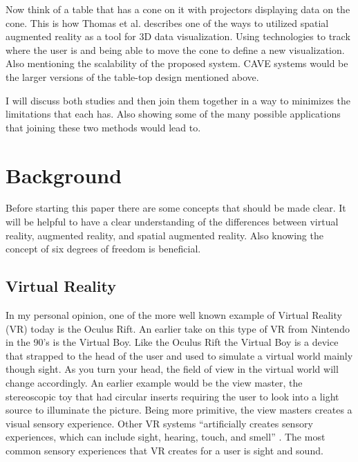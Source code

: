 \documentclass{sig-alternate}
\begin{document}
Now think of a table that has a cone on it with projectors displaying data on the cone. This is how Thomas et al. describes one of the ways to utilized spatial augmented reality as a tool for 3D data visualization. Using technologies to track where the user is and being able to move the cone to define a new visualization. Also mentioning the scalability of the proposed system. CAVE systems would be the larger versions of the table-top design mentioned above.      

I will discuss both studies and then join them together in a way to minimizes the limitations that each has. Also showing some of the many possible applications that joining these two methods would lead to.       


\section{Background}
\label{sec:background} 
Before starting this paper there are some concepts that should be made clear. It will be helpful to have a clear understanding of the differences between virtual reality, augmented reality, and spatial augmented reality. Also knowing the concept of six degrees of freedom is beneficial.  

\subsection{Virtual Reality}
\label{sec:Virtual Reality}
In my personal opinion, one of the more well known example of Virtual Reality (VR) today is the Oculus Rift. An earlier take on this type of VR from Nintendo in the 90's is the Virtual Boy. Like the Oculus Rift the Virtual Boy is a device that strapped to the head of the user and used to simulate a virtual world mainly though sight. As you turn your head, the field of view in the virtual world will change accordingly. An earlier example would be the view master, the stereoscopic toy that had circular inserts requiring the user to look into a light source to illuminate the picture. Being more primitive, the view masters creates a visual sensory experience. Other VR systems ``artificially creates sensory experiences, which can include sight, hearing, touch, and smell'' \cite{VR}. The most common sensory experiences that VR creates for a user is sight and sound.       
\end{document}
